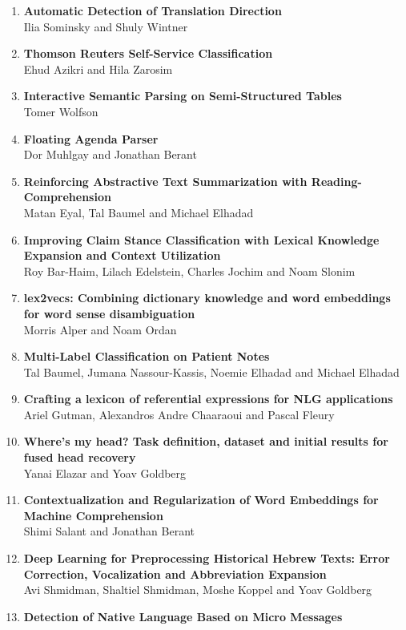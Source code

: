\documentclass[a0,portrait]{a0poster}
\begin{document}
\begin{enumerate}
\item
  \textbf{Automatic Detection of Translation Direction}\\
  Ilia Sominsky and Shuly Wintner
\item
  \textbf{Thomson Reuters Self-Service Classification}\\
  Ehud Azikri and Hila Zarosim
\item
  \textbf{Interactive Semantic Parsing on Semi-Structured Tables}\\
  Tomer Wolfson
\item
  \textbf{Floating Agenda Parser}\\
  Dor Muhlgay and Jonathan Berant
\item
  \textbf{Reinforcing Abstractive Text Summarization with
  Reading-Comprehension}\\
  Matan Eyal, Tal Baumel and Michael Elhadad
\item
  \textbf{Improving Claim Stance Classification with Lexical Knowledge
  Expansion and Context Utilization}\\
  Roy Bar-Haim, Lilach Edelstein, Charles Jochim and Noam Slonim
\item
  \textbf{lex2vecs: Combining dictionary knowledge and word embeddings
  for word sense disambiguation}\\
  Morris Alper and Noam Ordan
\item
  \textbf{Multi-Label Classification on Patient Notes}\\
  Tal Baumel, Jumana Nassour-Kassis, Noemie Elhadad and Michael Elhadad
\item
  \textbf{Crafting a lexicon of referential expressions for NLG
  applications}\\
  Ariel Gutman, Alexandros Andre Chaaraoui and Pascal Fleury
\item
  \textbf{Where's my head? Task definition, dataset and initial results
  for fused head recovery}\\
  Yanai Elazar and Yoav Goldberg
\item
  \textbf{Contextualization and Regularization of Word Embeddings for
  Machine Comprehension}\\
  Shimi Salant and Jonathan Berant
\item
  \textbf{Deep Learning for Preprocessing Historical Hebrew Texts: Error
  Correction, Vocalization and Abbreviation Expansion}\\
  Avi Shmidman, Shaltiel Shmidman, Moshe Koppel and Yoav Goldberg
\item
  \textbf{Detection of Native Language Based on Micro Messages}\\

\end{enumerate}
\end{document}
